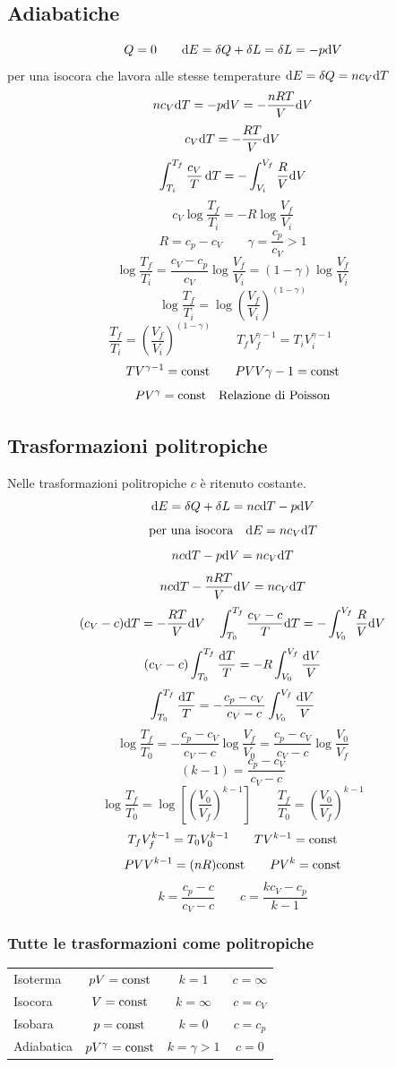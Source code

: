 \subsection{Adiabatiche}
$$Q=0\qquad \mathrm{d} E=\delta Q+\delta L=\delta L=-p\mathrm{d} V$$
per una isocora che lavora alle stesse temperature $\mathrm{d} E=\delta Q=nc_V\mathrm{d} T$
$$nc_V\mathrm{d} T=-p\mathrm{d} V=-\frac{nRT}{V}\mathrm{d} V$$
$$c_V\mathrm{d} T=-\frac{RT}{V}\mathrm{d} V$$
$$\int_{T_i}^{T_f}\frac{c_V}{T}\,\mathrm{d} T=-\int_{V_i}^{V_f}\frac{R}{V}\mathrm{d} V$$
$$c_V\log\frac{T_f}{T_i}=-R\log\frac{V_f}{V_i}$$
$$R=c_p-c_V\qquad \gamma=\frac{c_p}{c_V}>1$$
$$\log\frac{T_f}{T_i}=\frac{c_V-c_p}{c_V}\log\frac{V_f}{V_i}=(1-\gamma)\log\frac{V_f}{V_i}$$
$$\log\frac{T_f}{T_i}=\log\left(\frac{V_f}{V_i}\right)^{\left(1-\gamma\right)}$$
$$\frac{T_f}{T_i}=\left(\frac{V_f}{V_i}\right)^{\left(1-\gamma\right)}\qquad T_fV_f^{\gamma-1}=T_iV_i^{\gamma-1}\qquad$$
$$TV^{\gamma-1}=\text{const} \qquad PVV{\gamma-1}=\text{const}$$
\begin{equation}
PV^\gamma=\text{const}\quad\text{Relazione di Poisson}
\end{equation}



\subsection{Trasformazioni politropiche}
Nelle trasformazioni politropiche $c$ è ritenuto costante.
$$\mathrm{d} E=\delta Q+\delta L=nc\mathrm{d} T-p\mathrm{d} V$$
$$\text{per una isocora}\quad \mathrm{d} E=nc_V\mathrm{d} T$$
$$nc\mathrm{d} T-p\mathrm{d} V=nc_V\mathrm{d} T$$
$$nc\mathrm{d} T-\frac{nRT}{V}\mathrm{d} V=nc_V\mathrm{d} T$$
$$(c_V-c)\mathrm{d} T=-\frac{RT}{V}\mathrm{d} V\quad \int_{T_0}^{T_f}\frac{c_V-c}{T}\mathrm{d} T=-\int_{V_0}^{V_f}\frac{R}{V}\mathrm{d} V$$
$$(c_V-c)\int_{T_0}^{T_f}\frac{\mathrm{d} T}{T}=-R\int_{V_0}^{V_f}\frac{\mathrm{d} V}{V}$$
$$\int_{T_0}^{T_f}\frac{\mathrm{d} T}{T}=-\frac{c_p-c_V}{c_V-c}\int_{V_0}^{V_f}\frac{\mathrm{d} V}{V}$$
$$\log\frac{T_f}{T_0}=-\frac{c_p-c_V}{c_V-c}\log\frac{V_f}{V_0}=\frac{c_p-c_V}{c_V-c}\log\frac{V_0}{V_f}$$
$$(k-1)=\frac{c_p-c_V}{c_V-c}$$
$$\log\frac{T_f}{T_0}=\log\left[\left(\frac{V_0}{V_f}\right)^{k-1}\right]\qquad\frac{T_f}{T_0}=\left(\frac{V_0}{V_f}\right)^{k-1}$$
$$T_fV_f^{k-1}=T_0V_0^{k-1}\qquad TV^{k-1}=\text{const}$$
$$PVV^{k-1}=(nR)\text{const}\qquad PV^k=\text{const}$$
$$k=\frac{c_p-c}{c_V-c}\qquad c=\frac{kc_V-c_p}{k-1}$$
\subsubsection{Tutte le trasformazioni come politropiche}
\begin{center}
\begin{tabular}{l|ccc}
Isoterma&$pV=\text{const}$&$k=1$&$c=\infty$\\
Isocora&$V=\text{const}$&$k=\infty$&$c=c_V$\\
Isobara&$p=\text{const}$&$k=0$&$c=c_p$\\
Adiabatica&$pV^\gamma=\text{const}$&$k=\gamma>1$&$c=0$\\
\end{tabular}
\end{center}

